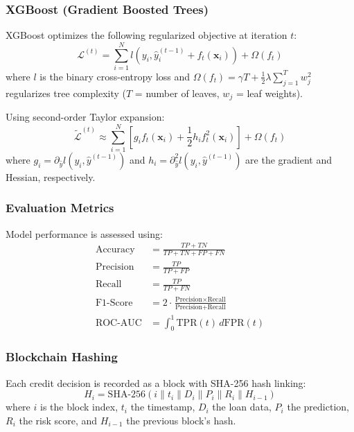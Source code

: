 \documentclass[preprint,12pt,authoryear]{elsarticle}
\begin{document}
\subsubsection{XGBoost (Gradient Boosted Trees)}
XGBoost optimizes the following regularized objective at iteration $t$:
\begin{equation}
    \mathcal{L}^{(t)} = \sum_{i=1}^{N} l(y_i, \hat{y}_i^{(t-1)} + f_t(\mathbf{x}_i)) + \Omega(f_t)
\end{equation}
where $l$ is the binary cross-entropy loss and $\Omega(f_t) = \gamma T + \frac{1}{2}\lambda \sum_{j=1}^{T} w_j^2$ regularizes tree complexity ($T$ = number of leaves, $w_j$ = leaf weights).

Using second-order Taylor expansion:
\begin{equation}
    \tilde{\mathcal{L}}^{(t)} \approx \sum_{i=1}^{N} \left[ g_i f_t(\mathbf{x}_i) + \frac{1}{2} h_i f_t^2(\mathbf{x}_i) \right] + \Omega(f_t)
\end{equation}
where $g_i = \partial_{\hat{y}} l(y_i, \hat{y}^{(t-1)})$ and $h_i = \partial^2_{\hat{y}} l(y_i, \hat{y}^{(t-1)})$ are the gradient and Hessian, respectively.

\subsubsection{Evaluation Metrics}
Model performance is assessed using:
\begin{align}
    \text{Accuracy} &= \frac{TP + TN}{TP + TN + FP + FN} \\
    \text{Precision} &= \frac{TP}{TP + FP} \\
    \text{Recall} &= \frac{TP}{TP + FN} \\
    \text{F1-Score} &= 2 \cdot \frac{\text{Precision} \times \text{Recall}}{\text{Precision} + \text{Recall}} \\
    \text{ROC-AUC} &= \int_0^1 \text{TPR}(t) \, d\text{FPR}(t)
\end{align}

\subsubsection{Blockchain Hashing}
Each credit decision is recorded as a block with SHA-256 hash linking:
\begin{equation}
    H_i = \text{SHA-256}(i \| t_i \| D_i \| P_i \| R_i \| H_{i-1})
\end{equation}
where $i$ is the block index, $t_i$ the timestamp, $D_i$ the loan data, $P_i$ the prediction, $R_i$ the risk score, and $H_{i-1}$ the previous block's hash.
\end{document}
